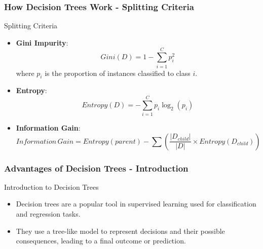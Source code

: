 \documentclass[aspectratio=169]{beamer}
\begin{document}
\begin{frame}[fragile]
    \frametitle{How Decision Trees Work - Splitting Criteria}
    \begin{block}{Splitting Criteria}
        \begin{itemize}
            \item \textbf{Gini Impurity}:
            \begin{equation}
                Gini(D) = 1 - \sum_{i=1}^{C} p_i^2
            \end{equation}
            where \( p_i \) is the proportion of instances classified to class \( i \).
            
            \item \textbf{Entropy}:
            \begin{equation}
                Entropy(D) = -\sum_{i=1}^{C} p_i \log_2(p_i)
            \end{equation}
            
            \item \textbf{Information Gain}:
            \begin{equation}
                Information\, Gain = Entropy(parent) - \sum \left( \frac{|D_{child}|}{|D|} \times Entropy(D_{child}) \right)
            \end{equation}
        \end{itemize}
    \end{block}
\end{frame}

\begin{frame}[fragile]
    \frametitle{Advantages of Decision Trees - Introduction}
    \begin{block}{Introduction to Decision Trees}
        \begin{itemize}
            \item Decision trees are a popular tool in supervised learning used for classification and regression tasks.
            \item They use a tree-like model to represent decisions and their possible consequences, leading to a final outcome or prediction.
        \end{itemize}
    \end{block}
\end{frame}
\end{document}
